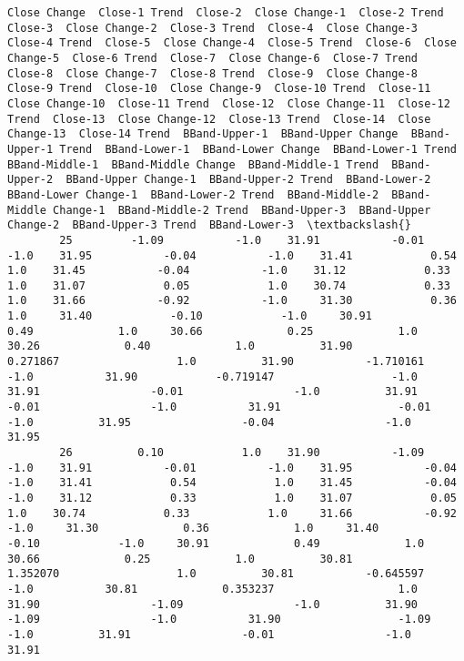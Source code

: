 \documentclass[11pt]{article}
\begin{document}
\begin{Verbatim}[commandchars=\\\{\}]
            Close Change  Close-1 Trend  Close-2  Close Change-1  Close-2 Trend  Close-3  Close Change-2  Close-3 Trend  Close-4  Close Change-3  Close-4 Trend  Close-5  Close Change-4  Close-5 Trend  Close-6  Close Change-5  Close-6 Trend  Close-7  Close Change-6  Close-7 Trend  Close-8  Close Change-7  Close-8 Trend  Close-9  Close Change-8  Close-9 Trend  Close-10  Close Change-9  Close-10 Trend  Close-11  Close Change-10  Close-11 Trend  Close-12  Close Change-11  Close-12 Trend  Close-13  Close Change-12  Close-13 Trend  Close-14  Close Change-13  Close-14 Trend  BBand-Upper-1  BBand-Upper Change  BBand-Upper-1 Trend  BBand-Lower-1  BBand-Lower Change  BBand-Lower-1 Trend  BBand-Middle-1  BBand-Middle Change  BBand-Middle-1 Trend  BBand-Upper-2  BBand-Upper Change-1  BBand-Upper-2 Trend  BBand-Lower-2  BBand-Lower Change-1  BBand-Lower-2 Trend  BBand-Middle-2  BBand-Middle Change-1  BBand-Middle-2 Trend  BBand-Upper-3  BBand-Upper Change-2  BBand-Upper-3 Trend  BBand-Lower-3  \textbackslash{}
        25         -1.09           -1.0    31.91           -0.01           -1.0    31.95           -0.04           -1.0    31.41            0.54            1.0    31.45           -0.04           -1.0    31.12            0.33            1.0    31.07            0.05            1.0    30.74            0.33            1.0    31.66           -0.92           -1.0     31.30            0.36             1.0     31.40            -0.10            -1.0     30.91             0.49             1.0     30.66             0.25             1.0     30.26             0.40             1.0          31.90            0.271867                  1.0          31.90           -1.710161                 -1.0           31.90            -0.719147                  -1.0          31.91                 -0.01                 -1.0          31.91                 -0.01                 -1.0           31.91                  -0.01                  -1.0          31.95                 -0.04                 -1.0          31.95   
        26          0.10            1.0    31.90           -1.09           -1.0    31.91           -0.01           -1.0    31.95           -0.04           -1.0    31.41            0.54            1.0    31.45           -0.04           -1.0    31.12            0.33            1.0    31.07            0.05            1.0    30.74            0.33            1.0     31.66           -0.92            -1.0     31.30             0.36             1.0     31.40            -0.10            -1.0     30.91             0.49             1.0     30.66             0.25             1.0          30.81            1.352070                  1.0          30.81           -0.645597                 -1.0           30.81             0.353237                   1.0          31.90                 -1.09                 -1.0          31.90                 -1.09                 -1.0           31.90                  -1.09                  -1.0          31.91                 -0.01                 -1.0          31.91   

\end{Verbatim}
\end{document}
